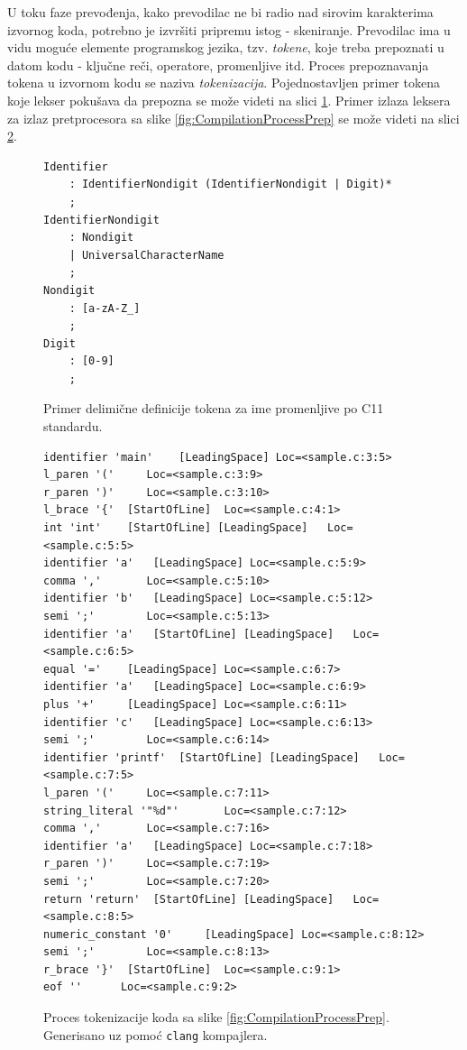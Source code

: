 U toku faze prevođenja, kako prevodilac ne bi radio nad sirovim karakterima izvornog koda, potrebno je izvršiti pripremu istog - skeniranje. Prevodilac ima u vidu moguće elemente programskog jezika, tzv. \emph{tokene}, koje treba prepoznati u datom kodu - ključne reči, operatore, promenljive itd. Proces prepoznavanja tokena u izvornom kodu se naziva \emph{tokenizacija}. Pojednostavljen primer tokena koje lekser pokušava da prepozna se može videti na slici \ref{fig:CLexerExample}. Primer izlaza leksera za izlaz pretprocesora sa slike \ref{fig:CompilationProcessPrep} se može videti na slici \ref{fig:CompilationProcessLex}.

\begin{figure}[h!]
\begin{lstlisting}[language={}]
Identifier 
    : IdentifierNondigit (IdentifierNondigit | Digit)*
    ;
IdentifierNondigit  
    : Nondigit
    | UniversalCharacterName
    ;
Nondigit 
    : [a-zA-Z_]
    ;
Digit 
    : [0-9]
    ;
\end{lstlisting}
\caption{Primer delimične definicije tokena za ime promenljive po C11 standardu.}
\label{fig:CLexerExample}
\end{figure}

\begin{figure}[h!]
\begin{lstlisting}[language={}]
identifier 'main'	 [LeadingSpace]	Loc=<sample.c:3:5>
l_paren '('		Loc=<sample.c:3:9>
r_paren ')'		Loc=<sample.c:3:10>
l_brace '{'	 [StartOfLine]	Loc=<sample.c:4:1>
int 'int'	 [StartOfLine] [LeadingSpace]	Loc=<sample.c:5:5>
identifier 'a'	 [LeadingSpace]	Loc=<sample.c:5:9>
comma ','		Loc=<sample.c:5:10>
identifier 'b'	 [LeadingSpace]	Loc=<sample.c:5:12>
semi ';'		Loc=<sample.c:5:13>
identifier 'a'	 [StartOfLine] [LeadingSpace]	Loc=<sample.c:6:5>
equal '='	 [LeadingSpace]	Loc=<sample.c:6:7>
identifier 'a'	 [LeadingSpace]	Loc=<sample.c:6:9>
plus '+'	 [LeadingSpace]	Loc=<sample.c:6:11>
identifier 'c'	 [LeadingSpace]	Loc=<sample.c:6:13>
semi ';'		Loc=<sample.c:6:14>
identifier 'printf'	 [StartOfLine] [LeadingSpace]	Loc=<sample.c:7:5>
l_paren '('		Loc=<sample.c:7:11>
string_literal '"%d"'		Loc=<sample.c:7:12>
comma ','		Loc=<sample.c:7:16>
identifier 'a'	 [LeadingSpace]	Loc=<sample.c:7:18>
r_paren ')'		Loc=<sample.c:7:19>
semi ';'		Loc=<sample.c:7:20>
return 'return'	 [StartOfLine] [LeadingSpace]	Loc=<sample.c:8:5>
numeric_constant '0'	 [LeadingSpace]	Loc=<sample.c:8:12>
semi ';'		Loc=<sample.c:8:13>
r_brace '}'	 [StartOfLine]	Loc=<sample.c:9:1>
eof ''		Loc=<sample.c:9:2>
\end{lstlisting}
\caption{Proces tokenizacije koda sa slike \ref{fig:CompilationProcessPrep}. Generisano uz pomoć \texttt{clang} \cite{Clang} kompajlera.}
\label{fig:CompilationProcessLex}
\end{figure}

